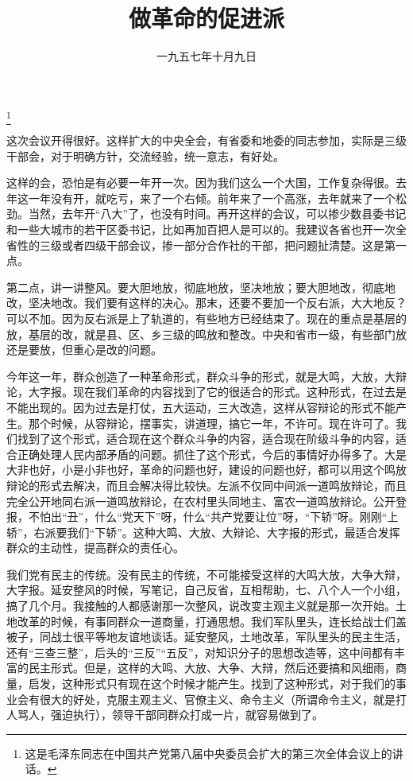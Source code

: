 
\title{做革命的促进派}
\date{一九五七年十月九日}
\thanks{这是毛泽东同志在中国共产党第八届中央委员会扩大的第三次全体会议上的讲话。}
\maketitle


这次会议开得很好。这样扩大的中央全会，有省委和地委的同志参加，实际是三级干部会，对于明确方针，交流经验，统一意志，有好处。

这样的会，恐怕是有必要一年开一次。因为我们这么一个大国，工作复杂得很。去年这一年没有开，就吃亏，来了一个右倾。前年来了一个高涨，去年就来了一个松劲。当然，去年开“八大”了，也没有时间。再开这样的会议，可以掺少数县委书记和一些大城市的若干区委书记，比如再加百把人是可以的。我建议各省也开一次全省性的三级或者四级干部会议，掺一部分合作社的干部，把问题扯清楚。这是第一点。

第二点，讲一讲整风。要大胆地放，彻底地放，坚决地放；要大胆地改，彻底地改，坚决地改。我们要有这样的决心。那末，还要不要加一个反右派，大大地反？可以不加。因为反右派是上了轨道的，有些地方已经结束了。现在的重点是基层的放，基层的改，就是县、区、乡三级的鸣放和整改。中央和省市一级，有些部门放还是要放，但重心是改的问题。

今年这一年，群众创造了一种革命形式，群众斗争的形式，就是大鸣，大放，大辩论，大字报。现在我们革命的内容找到了它的很适合的形式。这种形式，在过去是不能出现的。因为过去是打仗，五大运动，三大改造，这样从容辩论的形式不能产生。那个时候，从容辩论，摆事实，讲道理，搞它一年，不许可。现在许可了。我们找到了这个形式，适合现在这个群众斗争的内容，适合现在阶级斗争的内容，适合正确处理人民内部矛盾的问题。抓住了这个形式，今后的事情好办得多了。大是大非也好，小是小非也好，革命的问题也好，建设的问题也好，都可以用这个鸣放辩论的形式去解决，而且会解决得比较快。左派不仅同中间派一道鸣放辩论，而且完全公开地同右派一道鸣放辩论，在农村里头同地主、富农一道鸣放辩论。公开登报，不怕出“丑”，什么“党天下”呀，什么“共产党要让位”呀，“下轿”呀。刚刚“上轿”，右派要我们“下轿”。这种大鸣、大放、大辩论、大字报的形式，最适合发挥群众的主动性，提高群众的责任心。

我们党有民主的传统。没有民主的传统，不可能接受这样的大鸣大放，大争大辩，大字报。延安整风的时候，写笔记，自己反省，互相帮助，七、八个人一个小组，搞了几个月。我接触的人都感谢那一次整风，说改变主观主义就是那一次开始。土地改革的时候，有事同群众一道商量，打通思想。我们军队里头，连长给战士们盖被子，同战士很平等地友谊地谈话。延安整风，土地改革，军队里头的民主生活，还有“三查三整”，后头的“三反”“五反”，对知识分子的思想改造等，这中间都有丰富的民主形式。但是，这样的大鸣、大放、大争、大辩，然后还要搞和风细雨，商量，启发，这种形式只有现在这个时候才能产生。找到了这种形式，对于我们的事业会有很大的好处，克服主观主义、官僚主义、命令主义（所谓命令主义，就是打人骂人，强迫执行），领导干部同群众打成一片，就容易做到了。

